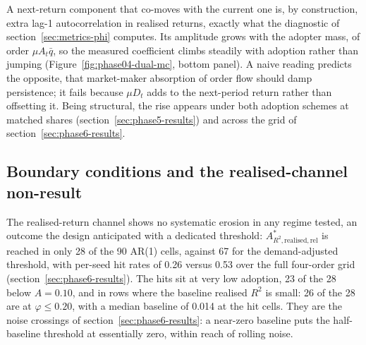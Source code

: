 \documentclass[12pt]{article}
\begin{document}
A next-return component that co-moves with the current one is, by construction, extra lag-1 autocorrelation in realised returns, exactly what the diagnostic of section~\ref{sec:metrics-phi} computes. Its amplitude grows with the adopter mass, of order $\mu A_t \bar{q}$, so the measured coefficient climbs steadily with adoption rather than jumping (Figure~\ref{fig:phase04-dual-mc}, bottom panel). %
A naive reading predicts the opposite, that market-maker absorption of order flow should damp persistence; it fails because $\mu D_t$ adds to the next-period return rather than offsetting it. %
Being structural, the rise appears under both adoption schemes at matched shares (section~\ref{sec:phase5-results}) and across the grid of section~\ref{sec:phase6-results}. %

\subsection{Boundary conditions and the realised-channel non-result}\label{sec:discussion-boundary}

The realised-return channel shows no systematic erosion in any regime tested, an outcome the design anticipated with a dedicated threshold: $A^{*}_{R^{2},\mathrm{realised},\mathrm{rel}}$ is reached in only 28 of the 90 AR(1) cells, against 67 for the demand-adjusted threshold, with per-seed hit rates of 0.26 versus 0.53 over the full four-order grid (section~\ref{sec:phase6-results}). %
The hits sit at very low adoption, 23 of the 28 below $A=0.10$, and in rows where the baseline realised $R^{2}$ is small: 26 of the 28 are at $\varphi\leq0.20$, with a median baseline of 0.014 at the hit cells. %
They are the noise crossings of section~\ref{sec:phase6-results}: a near-zero baseline puts the half-baseline threshold at essentially zero, within reach of rolling noise.
\end{document}
